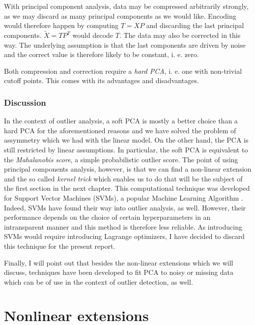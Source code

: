 \documentclass[]{report}
\theoremstyle{definition}
\theoremstyle{definition}
\theoremstyle{definition}
\theoremstyle{remark}
\begin{document}
With principal component analysis, data may be compressed arbitrarily
strongly, as we may discard as many principal components as we would
like. Encoding would therefore happen by computing \(T=XP\) and
discarding the last principal components. \(\tilde{X}=TP^T\) would
decode \(T\). The data may also be corrected in this way. The underlying
assumption is that the last components are driven by noise and the
correct value is therefore likely to be constant, i. e. zero.

Both compression and correction require a \emph{hard PCA}, i. e. one
with non-trivial cutoff points. This comes with its advantages and
disadvantages.

\hypertarget{discussion-1}{%
\subsection{Discussion}\label{discussion-1}}

In the context of outlier analysis, a soft PCA is mostly a better choice
than a hard PCA for the aforementioned reasons and we have solved the
problem of assymmetry which we had with the linear model. On the other
hand, the PCA is still restricted by linear assumptions. In particular,
the soft PCA is equivalent to the \emph{Mahalanobis score}, a simple
probabilistic outlier score. The point of using principal components
analysis, however, is that we can find a non-linear extension and the so
called \emph{kernel trick} which enables us to do that will be the
subject of the first section in the next chapter. This computational
technique was developed for Support Vector Machines (SVMs), a popular
Machine Learning Algorithm \citep[section 10.6]{Aggarwal2015}. Indeed,
SVMs have found their way into outlier analysis, as well. However, their
performance depends on the choice of certain hyperparameters in an
intransparent manner and this method is therefore less reliable.
\citep{Manevitz2001} As introducing SVMs would require introducing
Lagrange optimizers, I have decided to discard this technique for the
present report.

Finally, I will point out that besides the non-linear extensions which
we will discuss, techniques have been developed to fit PCA to noisy or
missing data \citep{Bailey2012} which can be of use in the context of
outlier detection, as well.

\hypertarget{nonlinear-extensions}{%
\chapter{Nonlinear extensions}\label{nonlinear-extensions}}
\end{document}
